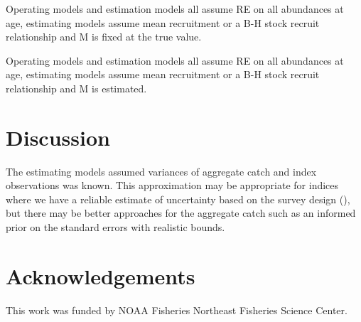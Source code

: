 \documentclass[
  12pt,
]{article}
\newlength{\cslhangindent}
\newlength{\cslentryspacingunit} %
\newenvironment{CSLReferences}[2] %
 {%
  \setlength{\parindent}{0pt}
  \ifodd #1
  \let\oldpar\par
  \def\par{\hangindent=\cslhangindent\oldpar}
  \fi
  \setlength{\parskip}{#2\cslentryspacingunit}
 }%
 {}
\begin{document}
\begin{table}
\caption{Operating models and estimation models all assume RE on all abundances at age, estimating models assume mean recruitment or a B-H stock recruit relationship and M is fixed at the true value.}
{}
\end{table}

\begin{table}
\caption{Operating models and estimation models all assume RE on all abundances at age, estimating models assume mean recruitment or a B-H stock recruit relationship and M is estimated.}
{}
\end{table}
\clearpage

\hypertarget{discussion}{%
\section{Discussion}\label{discussion}}

The estimating models assumed variances of aggregate catch and index
observations was known. This approximation may be appropriate for
indices where we have a reliable estimate of uncertainty based on the
survey design (), but there may be better approaches for the aggregate
catch such as an informed prior on the standard errors with realistic
bounds.

\hypertarget{acknowledgements}{%
\section*{Acknowledgements}\label{acknowledgements}}

This work was funded by NOAA Fisheries Northeast Fisheries Science
Center.

\pagebreak



\hypertarget{refs}{}
\begin{CSLReferences}{0}{0}
\end{CSLReferences}

\pagebreak

\clearpage
\end{document}
